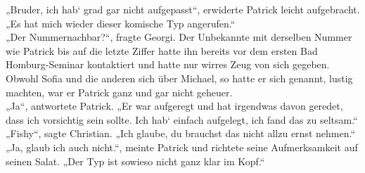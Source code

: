 \documentclass[oneside]{memoir}
\begin{document}
„Bruder, ich hab‘ grad gar nicht aufgepasst“, erwiderte Patrick leicht aufgebracht. „Es hat mich wieder dieser komische Typ angerufen.“ \\
„Der Nummernachbar?“, fragte Georgi. Der Unbekannte mit derselben Nummer wie Patrick bis auf die letzte Ziffer hatte ihn bereits vor dem ersten Bad Homburg-Seminar kontaktiert und hatte nur wirres Zeug von sich gegeben. Obwohl Sofia und die anderen sich über Michael, so hatte er sich genannt, lustig machten, war er Patrick ganz und gar nicht geheuer. \\
„Ja“, antwortete Patrick. „Er war aufgeregt und hat irgendwas davon geredet, dass ich vorsichtig sein sollte. Ich hab‘ einfach aufgelegt, ich fand das zu seltsam.“ \\
„Fishy“, sagte Christian. „Ich glaube, du brauchst das nicht allzu ernst nehmen.“ \\
„Ja, glaub ich auch nicht.“, meinte Patrick und richtete seine Aufmerksamkeit auf seinen Salat. „Der Typ ist sowieso nicht ganz klar im Kopf.“

\bigskip \bigskip \bigskip \bigskip 


\bigskip \bigskip \bigskip \bigskip
\end{document}
